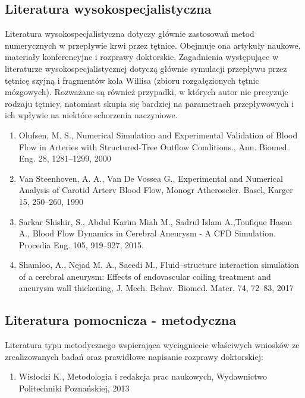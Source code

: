 \documentclass[11pt]{article} %
\begin{document}

\subsection{Literatura wysokospecjalistyczna} %

Literatura wysokospecjalistyczna dotyczy głównie zastosowań metod numerycznych w przepływie krwi przez tętnice. Obejmuje ona artykuły naukowe, materiały konferencyjne i rozprawy doktorskie. Zagadnienia występujące w literaturze wysokospecjalistycznej dotyczą głównie symulacji przepływu przez tętnicę szyjną i fragmentów koła Willisa (zbioru rozgałęzionych tętnic mózgowych). Rozważane są również przypadki, w których autor nie precyzuje rodzaju tętnicy, natomiast skupia się bardziej na parametrach przepływowych i ich wpływie na niektóre schorzenia naczyniowe. 
\begin{enumerate}
\item Olufsen, M. S., Numerical Simulation and Experimental Validation of Blood Flow in Arteries with Structured-Tree Outflow Conditions., Ann. Biomed. Eng. 28, 1281–1299, 2000
\item Van Steenhoven, A. A., Van De Vossea G., Experimental and Numerical Analysis of Carotid Arterv Blood Flow, Monogr Atheroscler. Basel, Karger 15, 250–260, 1990
\item Sarkar Shishir, S., Abdul Karim Miah M., Sadrul Islam A.,Toufique Hasan A., Blood Flow Dynamics in Cerebral Aneurysm - A CFD Simulation. Procedia Eng. 105, 919–927, 2015.
\item Shamloo, A., Nejad M. A., Saeedi M., Fluid–structure interaction simulation of a cerebral aneurysm: Effects of endovascular coiling treatment and aneurysm wall thickening, J. Mech. Behav. Biomed. Mater. 74, 72–83, 2017
\end{enumerate}


\subsection{Literatura pomocnicza - metodyczna} %

Literatura typu metodycznego wspierająca wyciągniecie właściwych wniosków ze zrealizowanych badań oraz prawidłowe napisanie rozprawy doktorskiej:
\begin{enumerate}
\item Wisłocki K., Metodologia i redakcja prac naukowych, Wydawnictwo Politechniki Poznańskiej, 2013
\end{enumerate}
\end{document}
